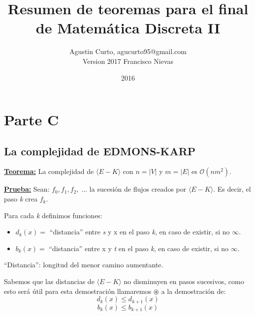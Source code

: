\documentclass[12pt,a4paper]{report}
\author{Agustin Curto, agucurto95@gmail.com\\
        Version 2017 Francisco Nievas}
\title{Resumen de teoremas para el final \\ de Matemática Discreta  II}
\date{2016}
\providecommand{\abs}[1]{\lvert#1\rvert}
\begin{document}
  \maketitle
  \tableofcontents


  \chapter{Parte C}

  	\section{La complejidad de EDMONS-KARP}
  		\textbf{\underline{Teorema:}} La complejidad de $\langle E-K \rangle$ con $n = \abs{V}$ y $m = \abs{E}$ es $\mathcal{O}(nm^{2})$.

  		\textbf{\underline{Prueba:}} Sean: $f_{0}, f_{1}, f_{2}, \; \dotsc$ \; la sucesión de flujos creados por $\langle E-K \rangle$. Es decir, el paso \textit{k} crea $f_{k}$.
  			\vspace{5mm}
  			\par Para cada \textit{k} definimos funciones:
  			\begin{itemize}
  				\item $d_{k}(x) =$ \textquotedblleft distancia\textquotedblright \; entre \textit{s} y x en el paso \textit{k}, en caso de existir, si no $\infty$.
  				\item $b_{k}(x) =$ \textquotedblleft distancia\textquotedblright \; entre x y \textit{t} en el paso \textit{k}, en caso de existir, si no $\infty$.
  			\end{itemize}

  			\textquotedblleft Distancia\textquotedblright: longitud del menor camino aumentante.

  			\vspace{5mm}
  			\par Sabemos que las distancias de $\langle E-K \rangle$ no disminuyen en pasos sucesivos, como esto será útil para esta demostración llamaremos $\circledast$ a la demostración de:
  				\[ d_{k}(x) \leq d_{k+1}(x) \]
  				\[ b_{k}(x) \leq b_{k+1}(x) \]
\end{document}
